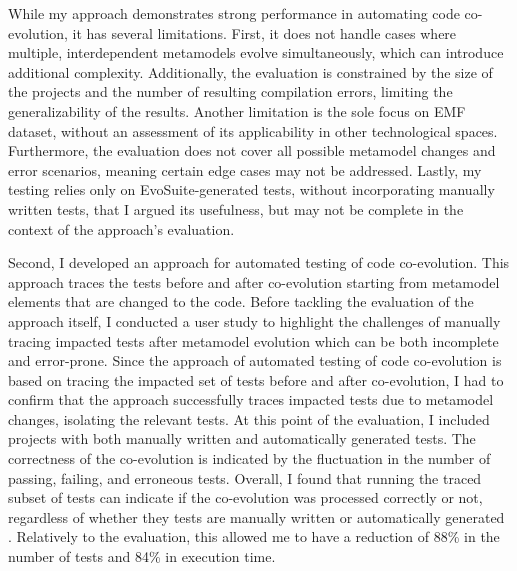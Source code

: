 

While my approach demonstrates strong performance in automating code co-evolution, it has several limitations. First, it does not handle cases where multiple, interdependent metamodels evolve simultaneously, which can introduce additional complexity. Additionally, the evaluation is constrained by the size of the projects and the number of resulting compilation errors, limiting the generalizability of the results. Another limitation is the sole focus on EMF dataset, without an assessment of its applicability in other technological spaces. Furthermore, the evaluation does not cover all possible metamodel changes and error scenarios, meaning certain edge cases may not be addressed. Lastly, my testing relies only on EvoSuite-generated tests, without incorporating manually written tests, that I argued its usefulness, but may not be complete in the context of the approach's evaluation.



Second, I developed an approach for automated testing of code co-evolution. This approach traces the tests before and after co-evolution starting from metamodel elements that are changed to the code.
Before tackling the evaluation of the approach itself, I conducted a user study to highlight the challenges of manually tracing impacted tests after metamodel evolution which can be both incomplete and error-prone. Since the approach of automated testing of code co-evolution is based on tracing the impacted set of tests before and after co-evolution, I had to confirm that the approach successfully traces impacted tests due to metamodel changes, isolating the relevant tests. At this point of the evaluation, I included projects with both manually written and automatically generated tests. The correctness of the co-evolution is indicated by the fluctuation in the number of passing, failing, and erroneous tests. Overall, I found that running the traced subset of tests can indicate if the co-evolution was processed correctly or not, regardless of whether they tests are manually written or automatically generated . Relatively to the evaluation, this allowed me to have a reduction of 88\% in the number of tests and 84\% in execution time.

